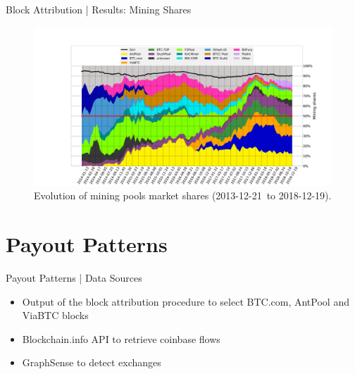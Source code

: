 \documentclass[10pt]{beamer}
\def\stackplotStart{2013-12-21}
\def\stackplotEnd{2018-12-19}
\begin{document}
\begin{frame}[fragile]{Block Attribution | Results: Mining Shares}
    \vspace*{-0.77cm}
    \begin{figure}
        \hspace*{-1.7cm}
        \includegraphics[width=1.23\textwidth]{images/stackplot_periodLen_2016secs_end_554399_numPeriods_138_threshold_4_groupBy_miner.pdf}
        \caption{Evolution of mining pools market shares (\stackplotStart~to \stackplotEnd).}
        \label{fig:stack_miners}
    \end{figure}
\end{frame}

\section{Payout Patterns} 
\begin{frame}[fragile]{Payout Patterns | Data Sources}
    \begin{itemize}
        \item Output of the block attribution procedure to select BTC.com, AntPool and ViaBTC blocks
        \item Blockchain.info API to retrieve coinbase flows
        \item GraphSense to detect exchanges
    \end{itemize}
\end{frame}
\end{document}
